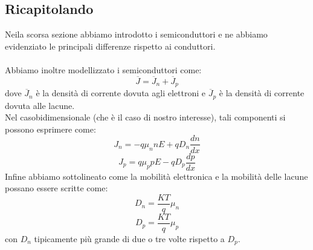 \documentclass{article}
\numberwithin{equation}{subsection}
\begin{document}
	\subsection{Ricapitolando}
	Neila scorsa sezione abbiamo introdotto i semiconduttori e ne abbiamo evidenziato le principali differenze rispetto ai conduttori.\\\\
	Abbiamo inoltre modellizzato i semiconduttori come:
	$$\overline{J} = \overline{J}_n + \overline{J}_p$$
	dove $\overline{J}_n$ è la densità di corrente dovuta agli elettroni e $\overline{J}_p$ è la densità di corrente dovuta alle lacune. \\
	Nel casobidimensionale (che è il caso di nostro interesse), tali componenti si possono esprimere come:
	$$J_n = -q\mu_n n E + q D_n \frac{dn}{dx}$$
	$$J_p = q\mu_p p E - q D_p \frac{dp}{dx}$$
	Infine abbiamo sottolineato come la mobilità elettronica e la mobilità delle lacune possano essere scritte come:
	$$D_n = \frac{KT}{q} \mu_n$$
	$$D_p = \frac{KT}{q} \mu_p$$
	con $D_n$ tipicamente più grande di due o tre volte rispetto a $D_p$.
\end{document}
